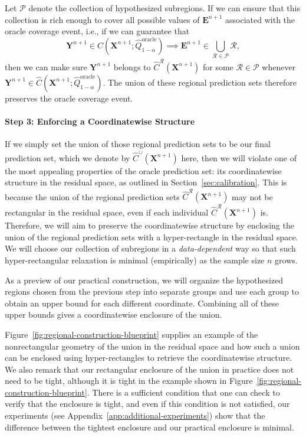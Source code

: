 Let $\mathcal{P}$ denote the collection of hypothesized subregions. If we can ensure that this collection is rich enough to cover all possible values of $\mathbf E^{n+1}$ associated with the oracle coverage event, i.e., if we can guarantee that
\begin{equation}\label{eq:subregions-requirement}
\mathbf Y^{n+1}\in
\hat C(\mathbf X^{n+1};\hat Q^{\mathrm{oracle}}_{1-\alpha})
\implies
\mathbf E^{n+1}\in
\bigcup_{\mathcal{R}\in\mathcal{P}}\mathcal{R},
\end{equation}
then we can make sure $\mathbf Y^{n+1}$ belongs to $\hat C^{\mathcal R}(\mathbf X^{n+1})$ for some $\mathcal{R}\in\mathcal{P}$ whenever $\mathbf Y^{n+1}\in\hat C(\mathbf X^{n+1};\hat Q^{\mathrm{oracle}}_{1-\alpha})$. The union of these regional prediction sets therefore preserves the oracle coverage event. 

\paragraph{Step 3: Enforcing a Coordinatewise Structure} If we simply set the union of those regional prediction sets to be our final prediction set, which we denote by $\hat C^{\cup}(\mathbf X^{n+1})$ here, then we will violate one of the most appealing properties of the oracle prediction set: its coordinatewise structure in the residual space, as outlined in Section~\ref{sec:calibration}. This is because the union of the regional prediction sets $\hat C^{\mathcal R}(\mathbf X^{n+1})$ may not be rectangular in the residual space, even if each individual $\hat C^{\mathcal R}(\mathbf X^{n+1})$ is. Therefore, we will aim to preserve the coordinatewise structure by enclosing the union of the regional prediction sets with a hyper-rectangle in the residual space. We will choose our collection of subregions in a \emph{data-dependent} way so that such hyper-rectangular relaxation is minimal (empirically) as the sample size $n$ grows.

As a preview of our practical construction, we will organize the hypothesized regions chosen from the previous step into separate groups and use each group to obtain an upper bound for each different coordinate. Combining all of these upper bounds gives a coordinatewise enclosure of the union. 

Figure~\ref{fig:regional-construction-blueprint} supplies an example of the nonrectangular geometry of the union in the residual space and how such a union can be enclosed using hyper-rectangles to retrieve the coordinatewise structure. We also remark that our rectangular enclosure of the union in practice does not need to be tight, although it is tight in the example shown in Figure~\ref{fig:regional-construction-blueprint}. There is a sufficient condition that one can check to verify that the enclosure is tight, and even if this condition is not satisfied, our experiments (see Appendix~\ref{app:additional-experiments}) show that the difference between the tightest enclosure and our practical enclosure is minimal.

